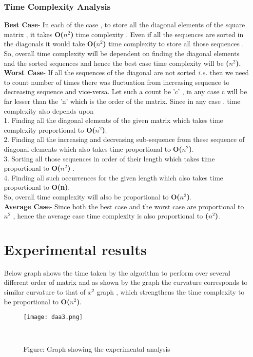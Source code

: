 \documentclass[twocolumn]{article}      %
\begin{document}
\subsubsection{Time Complexity Analysis}

\textbf{Best Case}- In each of the case , to store all the diagonal elements of the square matrix , it takes \textbf{O($n^2$)} time complexity . Even if all the sequences are sorted in the diagonals it would take \textbf{O($n^2$)} time complexity to store all those sequences . So, overall time complexity will be dependent on finding the diagonal elements and the sorted sequences and hence the best case time complexity will be \textbf{\Omega($n^2$)}.\\
\textbf{Worst Case}- If all the sequences of the diagonal are not sorted \textit{i.e.} then we need to count number of times there was fluctuation from increasing sequence to decreasing sequence and vice-versa. Let such a count be 'c' , in any case c will be far lesser than the 'n' which is the order of the matrix. Since in any case , time complexity also depends upon \newpage\\1. Finding all the diagonal elements of the given matrix which takes time complexity proportional to \textbf{O($n^2$)}.\\2. Finding all the increasing and decreasing sub-sequence from these sequence of diagonal elements which also takes time proportional to \textbf{O($n^2$)}.\\3. Sorting all those sequences in order of their length which takes time proportional to \textbf{O($n^2$)} .\\4. Finding all such occurrences for the given length which also takes time proportional to \textbf{O(n)}.\\
So, overall time complexity will also be proportional to \textbf{O($n^2$)}.\\
\textbf{Average Case}- Since both the best case and the worst case are proportional to $n^2$ , hence the average case time complexity is also proportional to \textbf{\Theta($n^2$)}.
\newpage
\section{Experimental results}
Below graph shows the time taken by the algorithm to perform over several different order of matrix and as shown by the graph the curvature corresponds to similar curvature to that of $x^2$ graph , which strengthens the time complexity to be proportional to \textbf{O($n^2$)}.
\begin{figure}
\hspace*{-0.5cm}
\texttt{[image: daa3.png]}
\caption{Figure: Graph showing the experimental analysis  }\\
\end{figure}
\newpage
\end{document}
